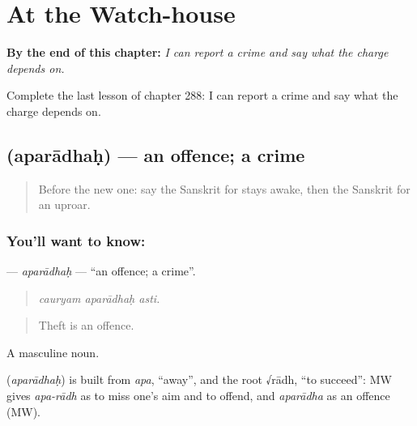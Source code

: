 
\chapter{At the Watch-house}
\label{ch:sa-at-the-watch-house}

\begin{chapteropening}
\textbf{By the end of this chapter:} \emph{I can report a crime and say what the charge depends on.}

Complete the last lesson of chapter 288: I can report a crime and say what the charge depends on.
\end{chapteropening}

\section[\texorpdfstring{\sk{अपराधः} (aparādhaḥ)}{अपराधः (aparādhaḥ)}]{ (aparādhaḥ) — an offence; a crime}

\label{lesson:SA-C288-aparadhah}



\begin{quote}
Before the new one: say the Sanskrit for stays awake, then the Sanskrit for an uproar.
\end{quote}

\subsection*{You'll want to know: }
\textbf{} — \emph{aparādhaḥ} — \textquotedblleft{}an offence; a crime\textquotedblright{}.

\begin{quote}
  
\end{quote}

\begin{quote}
\emph{cauryam aparādhaḥ asti.}
\end{quote}

\begin{quote}
Theft is an offence.
\end{quote}

A masculine noun.

\begin{cousinweb}
\textbf{} (\emph{aparādhaḥ}) is built from \emph{apa}, \textquotedblleft{}away\textquotedblright{}, and the root √rādh, \textquotedblleft{}to succeed\textquotedblright{}: MW gives \emph{apa-rādh} as to miss one's aim and to offend, and \emph{aparādha} as an offence (MW).
\end{cousinweb}

